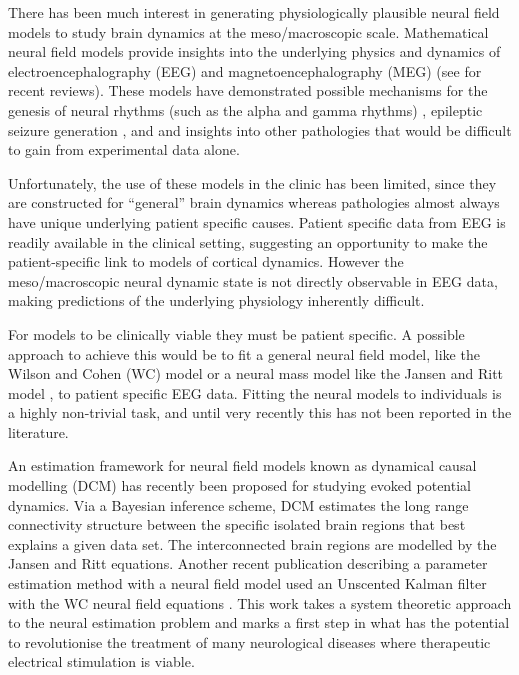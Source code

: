 \documentclass[12pt]{iopart}
\begin{document}
There has been much interest in generating physiologically plausible neural field models to study brain dynamics at the meso/macroscopic scale. Mathematical neural field models provide insights into the underlying physics and dynamics of electroencephalography (EEG) and magnetoencephalography (MEG) (see \cite{Deco2008} \cite{David2003} for recent reviews). These models have demonstrated possible mechanisms for the genesis of neural rhythms (such as the alpha and gamma rhythms) \cite{Liley1999} \cite{RENNIE2000}, epileptic seizure generation \cite{DaSilva2003}, \cite{Suffczynski2004} and \cite{Wendling2005} and insights into other pathologies \cite{Moran2008} \cite{Schiff2009} that would be difficult to gain from experimental data alone. 

Unfortunately, the use of these models in the clinic has been limited, since they are constructed for ``general'' brain dynamics whereas pathologies almost always have unique underlying patient specific causes. Patient specific data from EEG is readily available in the clinical setting, suggesting an opportunity to make the patient-specific link to models of cortical dynamics. However the meso/macroscopic neural dynamic state is not directly observable in EEG data, making predictions of the underlying physiology inherently difficult.

For models to be clinically viable they must be patient specific. A possible approach to achieve this would be to fit a general neural field model, like the Wilson and Cohen (WC) \cite{Wilson1973} model or a neural mass model like the Jansen and Ritt model \cite{Jansen1995}, to patient specific EEG data. Fitting the neural models to individuals is a highly non-trivial task, and until very recently this has not been reported in the literature. 

An estimation framework for neural field models known as dynamical causal modelling (DCM) \cite{David2003} \cite{David2006} has recently been proposed for studying evoked potential dynamics. Via a Bayesian inference scheme, DCM estimates the long range connectivity structure between the specific isolated brain regions that best explains a given data set. The interconnected brain regions are modelled by the Jansen and Ritt equations. Another recent publication describing a parameter estimation method with a neural field model used an Unscented Kalman filter with the WC neural field equations \cite{schiff2008kalman}. This work takes a system theoretic approach to the neural estimation problem and marks a first step in what has the potential to revolutionise the treatment of many neurological diseases where therapeutic electrical stimulation is viable.
\end{document}

